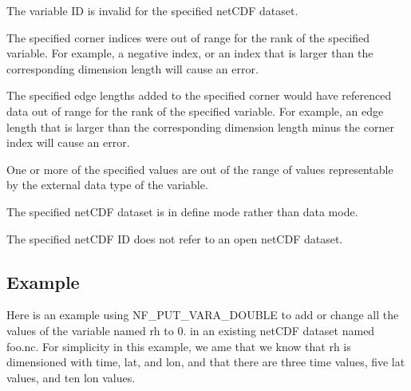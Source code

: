 \begin{DoxyItemize}
\item The variable ID is invalid for the specified net\+C\+DF dataset.
\item The specified corner indices were out of range for the rank of the specified variable. For example, a negative index, or an index that is larger than the corresponding dimension length will cause an error.
\item The specified edge lengths added to the specified corner would have referenced data out of range for the rank of the specified variable. For example, an edge length that is larger than the corresponding dimension length minus the corner index will cause an error.
\item One or more of the specified values are out of the range of values representable by the external data type of the variable.
\item The specified net\+C\+DF dataset is in define mode rather than data mode.
\item The specified net\+C\+DF ID does not refer to an open net\+C\+DF dataset.
\end{DoxyItemize}

\subsection*{Example }

Here is an example using N\+F\+\_\+\+P\+U\+T\+\_\+\+V\+A\+R\+A\+\_\+\+D\+O\+U\+B\+LE to add or change all the values of the variable named rh to 0. in an existing net\+C\+DF dataset named foo.\+nc. For simplicity in this example, we ame that we know that rh is dimensioned with time, lat, and lon, and that there are three time values, five lat values, and ten lon values.

 

